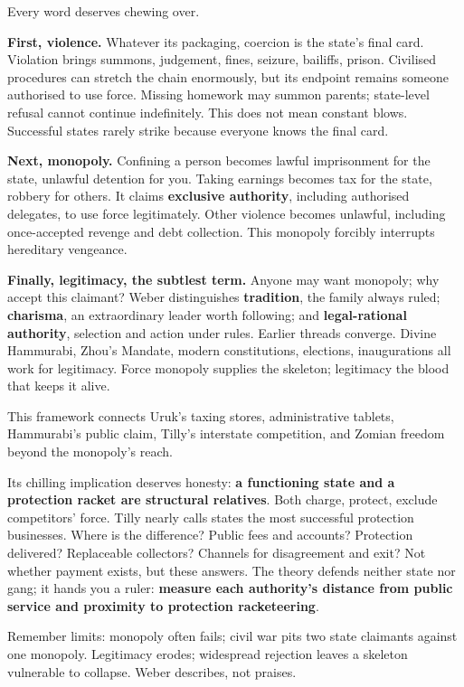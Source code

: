Every word deserves chewing over.

\textbf{First, violence.} Whatever its packaging, coercion is the state's final card. Violation brings summons, judgement, fines, seizure, bailiffs, prison. Civilised procedures can stretch the chain enormously, but its endpoint remains someone authorised to use force. Missing homework may summon parents; state-level refusal cannot continue indefinitely. This does not mean constant blows. Successful states rarely strike because everyone knows the final card.

\textbf{Next, monopoly.} Confining a person becomes lawful imprisonment for the state, unlawful detention for you. Taking earnings becomes tax for the state, robbery for others. It claims \textbf{exclusive authority}, including authorised delegates, to use force legitimately. Other violence becomes unlawful, including once-accepted revenge and debt collection. This monopoly forcibly interrupts hereditary vengeance.

\textbf{Finally, legitimacy, the subtlest term.} Anyone may want monopoly; why accept this claimant? Weber distinguishes \textbf{tradition}, the family always ruled; \textbf{charisma}, an extraordinary leader worth following; and \textbf{legal-rational authority}, selection and action under rules. Earlier threads converge. Divine Hammurabi, Zhou's Mandate, modern constitutions, elections, inaugurations all work for legitimacy. Force monopoly supplies the skeleton; legitimacy the blood that keeps it alive.

This framework connects Uruk's taxing stores, administrative tablets, Hammurabi's public claim, Tilly's interstate competition, and Zomian freedom beyond the monopoly's reach.

Its chilling implication deserves honesty: \textbf{a functioning state and a protection racket are structural relatives}. Both charge, protect, exclude competitors' force. Tilly nearly calls states the most successful protection businesses. Where is the difference? Public fees and accounts? Protection delivered? Replaceable collectors? Channels for disagreement and exit? Not whether payment exists, but these answers. The theory defends neither state nor gang; it hands you a ruler: \textbf{measure each authority's distance from public service and proximity to protection racketeering}.

Remember limits: monopoly often fails; civil war pits two state claimants against one monopoly. Legitimacy erodes; widespread rejection leaves a skeleton vulnerable to collapse. Weber describes, not praises.

